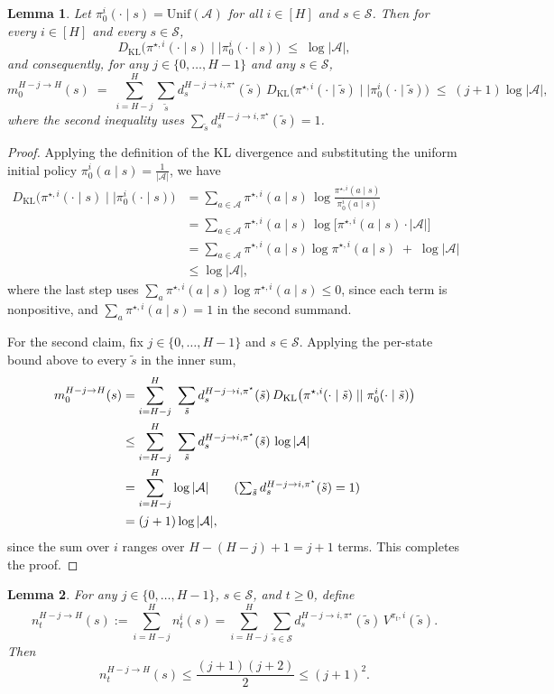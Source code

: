 \documentclass[11pt]{article}
\newtheorem{lem}{Lemma}
\begin{document}
\begin{lem}\label{lem:m_0}
Let $\pi_0^i(\cdot\mid s)=\mathrm{Unif}(\mathcal A)$ for all $i\in[H]$ and $s\in\mathcal S$. Then for every $i\in[H]$ and every $s\in\mathcal S$,
\[
D_{\mathrm{KL}}\big(\pi^{\star,i}(\cdot\mid s)\mid\mid\pi^i_0(\cdot\mid s)\big) \;\le\; \log|\mathcal A|,
\]
and consequently, for any $j\in\{0,\dots,H-1\}$ and any $s\in\mathcal S$,
\[
m_0^{H-j\to H}(s)\;=\;\sum^H_{i=H-j}\sum_{\tilde s} d^{H-j\to i,\pi^\star}_s(\tilde s)\,D_{\mathrm{KL}}\big(\pi^{\star,i}(\cdot\mid \tilde s)\mid\mid\pi^i_0(\cdot\mid \tilde s)\big)\;\le\;(j+1)\log|\mathcal A|,
\]
where the second inequality uses $\sum_{\tilde s} d^{H-j\to i,\pi^\star}_s(\tilde s)=1$.
\end{lem}
\begin{proof}
Applying the definition of the KL divergence and substituting the uniform initial policy $\pi_0^i(a\mid s)=\frac{1}{|\mathcal A|}$, we have
\begin{align*}
D_{\mathrm{KL}}\big(\pi^{\star,i}(\cdot\mid s)\mid\mid\pi^i_0(\cdot\mid s)\big)
&= \sum_{a\in\mathcal A} \pi^{\star,i}(a\mid s)\,\log\frac{\pi^{\star,i}(a\mid s)}{\pi^i_0(a\mid s)} \\
&= \sum_{a\in\mathcal A} \pi^{\star,i}(a\mid s)\,\log\big[\pi^{\star,i}(a\mid s)\cdot|\mathcal A|\big] \\
&= \sum_{a\in\mathcal A} \pi^{\star,i}(a\mid s)\log \pi^{\star,i}(a\mid s) \;+\; \log|\mathcal A| \\
&\le \log|\mathcal A|,
\end{align*}
where the last step uses $\sum_{a}\pi^{\star,i}(a\mid s)\log\pi^{\star,i}(a\mid s)\le 0$, since each term is nonpositive, and $\sum_a \pi^{\star,i}(a\mid s)=1$ in the second summand.

For the second claim, fix $j\in\{0,\dots,H-1\}$ and $s\in\mathcal S$. Applying the per-state bound above to every $\tilde s$ in the inner sum,
\begin{align*}
m_0^{H-j\to H}(s)
&= \sum^H_{i=H-j}\ \sum_{\tilde s} d^{H-j\to i,\pi^\star}_s(\tilde s)\,
D_{\mathrm{KL}}\big(\pi^{\star,i}(\cdot\mid \tilde s)\mid\mid\pi^i_0(\cdot\mid \tilde s)\big) \\
&\le \sum^H_{i=H-j}\ \sum_{\tilde s} d^{H-j\to i,\pi^\star}_s(\tilde s)\,\log|\mathcal A| \\
&= \sum^H_{i=H-j} \log|\mathcal A|
\tag{$\textstyle\sum_{\tilde s} d^{H-j\to i,\pi^\star}_s(\tilde s)=1$} \\
&= (j+1)\log|\mathcal A|,
\end{align*}
since the sum over $i$ ranges over $H-(H-j)+1=j+1$ terms. This completes the proof.
\end{proof}
\begin{lem}\label{lem:nk}
For any $j\in\{0,\ldots,H-1\}$, $s\in\mathcal S$, and $t\ge0$, define
\[
n_t^{H-j\to H}(s)
:=
\sum_{i=H-j}^H n_t^i(s)
=
\sum_{i=H-j}^H
\sum_{\tilde s\in\mathcal S}
d_s^{H-j\to i,\pi^\star}(\tilde s)\,
V^{\pi_t,i}(\tilde s).
\]
Then
\[
n_t^{H-j\to H}(s)
\le
\frac{(j+1)(j+2)}{2}
\le
(j+1)^2.
\]
\end{lem}
\end{document}
